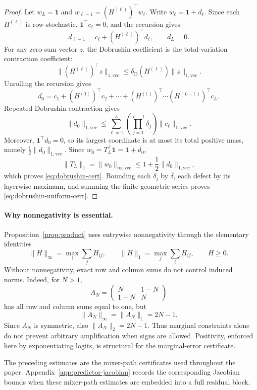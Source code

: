 \documentclass[10pt]{article}
\numberwithin{equation}{section}
\theoremstyle{plain}
\theoremstyle{definition}
\theoremstyle{remark}
\newcommand{\ones}{\mathbf{1}}
\begin{document}
\begin{proof}
Let \(w_L=\ones\) and \(w_{\ell-1}=(H^{(\ell)})^\top w_\ell\).  Write
\(w_\ell=\ones+d_\ell\).  Since each \(H^{(\ell)}\) is row-stochastic,
\(\ones^\top c_\ell=0\), and the recursion gives
\[
        d_{\ell-1}=c_\ell+(H^{(\ell)})^\top d_\ell,\qquad d_L=0 .
\]
For any zero-sum vector \(z\), the Dobrushin coefficient is the total-variation
contraction coefficient:
\[
        \|(H^{(\ell)})^\top z\|_{1,\mathrm{vec}}
        \le
        \delta_{\mathrm D}(H^{(\ell)})\|z\|_{1,\mathrm{vec}} .
\]
Unrolling the recursion gives
\[
d_0
=
c_1+(H^{(1)})^\top c_2+\cdots+
(H^{(1)})^\top\cdots(H^{(L-1)})^\top c_L.
\]
Repeated Dobrushin contraction gives
\[
\|d_0\|_{1,\mathrm{vec}}
\le
\sum_{\ell=1}^L
\left(\prod_{j=1}^{\ell-1}\delta_j\right)
\|c_\ell\|_{1,\mathrm{vec}}.
\]
Moreover, \(\ones^\top d_0=0\), so its largest coordinate is at most its total
positive mass, namely \(\frac12\|d_0\|_{1,\mathrm{vec}}\). Since
\(w_0=T_L^\top\ones=\ones+d_0\),
\[
        \|T_L\|_1
        =
        \|w_0\|_{\infty,\mathrm{vec}}
        \le
        1+\frac12\|d_0\|_{1,\mathrm{vec}},
\]
which proves \eqref{eq:dobrushin-cert}. Bounding each \(\delta_j\) by
\(\bar\delta\), each defect by its layerwise maximum, and summing the finite
geometric series proves \eqref{eq:dobrushin-uniform-cert}.
\end{proof}


\paragraph{Why nonnegativity is essential.}

Proposition~\ref{prop:product} uses entrywise nonnegativity through the elementary
identities
\[
        \|H\|_\infty=\max_i\sum_j H_{ij},
        \qquad
        \|H\|_1=\max_j\sum_i H_{ij},
        \qquad H\ge0.
\]
Without nonnegativity, exact row and column sums do not control induced norms.
Indeed, for \(N>1\),
\[
        A_N=
        \begin{pmatrix}
        N & 1-N\\
        1-N & N
        \end{pmatrix}
\]
has all row and column sums equal to one, but
\[
        \|A_N\|_\infty=\|A_N\|_1=2N-1.
\]
Since \(A_N\) is symmetric, also \(\|A_N\|_2=2N-1\). Thus marginal constraints
alone do not prevent arbitrary amplification when signs are allowed. Positivity,
enforced here by exponentiating logits, is structural for the
marginal-error certificate.

The preceding estimates are the mixer-path certificates used throughout the
paper. Appendix~\ref{app:predictor-jacobian} records the corresponding Jacobian bounds when these mixer-path estimates are embedded into a full residual block.
\end{document}
